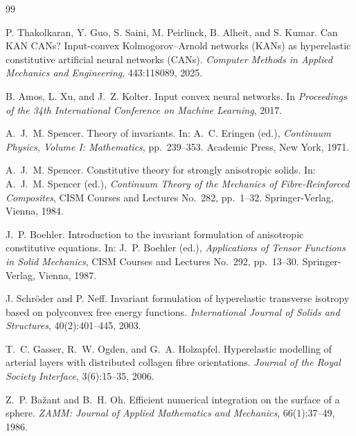 \documentclass[11pt,a4paper]{article}
\begin{document}
\begin{thebibliography}{99}

P. Thakolkaran, Y. Guo, S. Saini, M. Peirlinck, B. Alheit, and S. Kumar.
Can KAN CANs? Input-convex Kolmogorov--Arnold networks (KANs) as
hyperelastic constitutive artificial neural networks (CANs).
\emph{Computer Methods in Applied Mechanics and Engineering}, 443:118089, 2025.

B. Amos, L. Xu, and J.~Z. Kolter. Input convex neural networks. In
\emph{Proceedings of the 34th International Conference on Machine Learning}, 2017.

A.~J.~M. Spencer. Theory of invariants. In: A.~C. Eringen (ed.),
\emph{Continuum Physics, Volume I: Mathematics}, pp.~239--353. Academic
Press, New York, 1971.

A.~J.~M. Spencer. Constitutive theory for strongly anisotropic solids.
In: A.~J.~M. Spencer (ed.), \emph{Continuum Theory of the Mechanics of
Fibre-Reinforced Composites}, CISM Courses and Lectures No.~282,
pp.~1--32. Springer-Verlag, Vienna, 1984.

J.~P. Boehler. Introduction to the invariant formulation of anisotropic
constitutive equations. In: J.~P. Boehler (ed.), \emph{Applications of
Tensor Functions in Solid Mechanics}, CISM Courses and Lectures No.~292,
pp.~13--30. Springer-Verlag, Vienna, 1987.

J. Schr\"oder and P. Neff. Invariant formulation of hyperelastic
transverse isotropy based on polyconvex free energy functions.
\emph{International Journal of Solids and Structures}, 40(2):401--445,
2003.

T.~C. Gasser, R.~W. Ogden, and G.~A. Holzapfel. Hyperelastic modelling of
arterial layers with distributed collagen fibre orientations.
\emph{Journal of the Royal Society Interface}, 3(6):15--35, 2006.

Z.~P. Ba\v{z}ant and B.~H. Oh. Efficient numerical integration on the
surface of a sphere. \emph{ZAMM: Journal of Applied Mathematics and
Mechanics}, 66(1):37--49, 1986.

\end{thebibliography}
\end{document}
